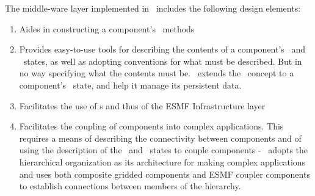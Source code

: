 The middle-ware layer implemented in \ggn\  includes the following
design elements:
%
\begin{enumerate}
%
\item Aides in constructing a component's \IRF\ methods

\item Provides easy-to-use tools for describing the contents of a
  component's \im\ and \ex\ states, as well as adopting conventions for what
  must be described. But in no way specifying what the contents must be.
  \ggn\ extends the \stt\  concept to a component's \gin\ state, and
  help it manage its persistent data.
  
\item Facilitates the use of \fld s and thus of the ESMF 
  Infrastructure layer

\item Facilitates the coupling of components into complex applications. This
  requires a means of describing the connectivity between components and
  of using the description of the \im\ and \ex\ states to couple
  components - \ggn\ adopts the hierarchical organization as its
  architecture for making complex applications and uses both composite
  gridded components and ESMF coupler components to establish connections
  between members of the hierarchy.
\end{enumerate}






